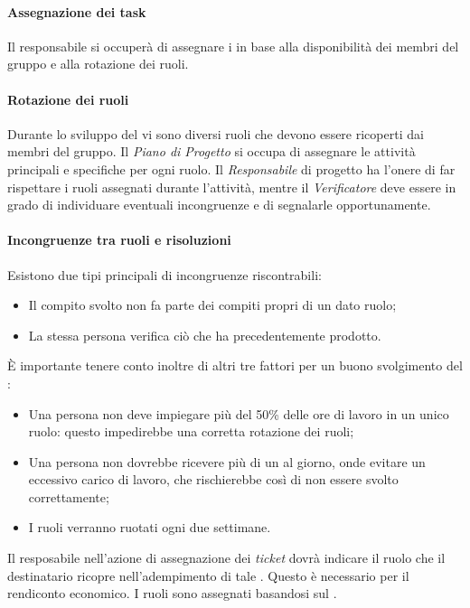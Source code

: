 \paragraph*{Assegnazione dei task} Il responsabile si occuperà di assegnare i  in base alla disponibilità dei membri del gruppo e alla rotazione dei ruoli.

\paragraph*{Rotazione dei ruoli}

Durante lo sviluppo del  vi sono diversi ruoli che devono essere ricoperti dai membri del gruppo. Il \textit{Piano di Progetto} si occupa di assegnare le attività principali e specifiche per ogni ruolo. Il \textit{Responsabile} di progetto ha l'onere di far rispettare i ruoli assegnati durante l'attività, mentre il \textit{Verificatore} deve essere in grado di individuare eventuali incongruenze e di segnalarle opportunamente.
\paragraph*{Incongruenze tra ruoli e risoluzioni}
Esistono due tipi principali di incongruenze riscontrabili:
\begin{itemize}

\item Il compito svolto non fa parte dei compiti propri di un dato ruolo;
\item La stessa persona verifica ciò che ha precedentemente prodotto.
\end{itemize}

È importante tenere conto inoltre di altri tre fattori per un buono svolgimento del :
\begin{itemize}

\item Una persona non deve impiegare più del 50\% delle ore di lavoro in un unico ruolo: questo impedirebbe una corretta rotazione dei ruoli;
\item Una persona non dovrebbe ricevere più di un  al giorno, onde evitare un eccessivo carico di lavoro, che rischierebbe cos\`i di non essere svolto correttamente;
\item I ruoli verranno ruotati ogni due settimane.

\end{itemize}

Il resposabile nell'azione di assegnazione dei \textit{ticket} dovr\`a indicare il ruolo che il destinatario ricopre nell'adempimento di tale . Questo \`e necessario per il rendiconto economico. I ruoli sono assegnati basandosi sul \PianoDiProgetto.

